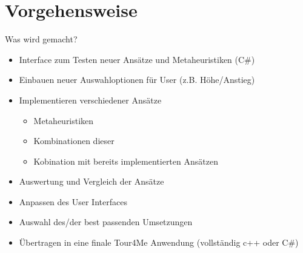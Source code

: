 \documentclass[aspectratio=169,xcolor=dvipsnames, t]{beamer}
\begin{document}
	
	\section{Vorgehensweise}		
	\begin{frame}	
		\vspace{0.5cm}
		\begin{block}{Was wird gemacht?}
			\pause
			\begin{itemize}[<+->]
				\item Interface zum Testen neuer Ansätze und Metaheuristiken (C\#)
				\item Einbauen neuer Auswahloptionen für User (z.B. Höhe/Anstieg)
				\item Implementieren verschiedener Ansätze
				\begin{itemize}[<+->]
					\item Metaheuristiken
					\item Kombinationen dieser
					\item Kobination mit bereits implementierten Ansätzen
				\end{itemize}
				\item Auswertung und Vergleich der Ansätze
				\item Anpassen des User Interfaces
				\item Auswahl des/der best passenden Umsetzungen
				\item Übertragen in eine finale Tour4Me Anwendung (vollständig c++ oder C\#)
			\end{itemize}
		\end{block}
	\end{frame}
	
\end{document}
